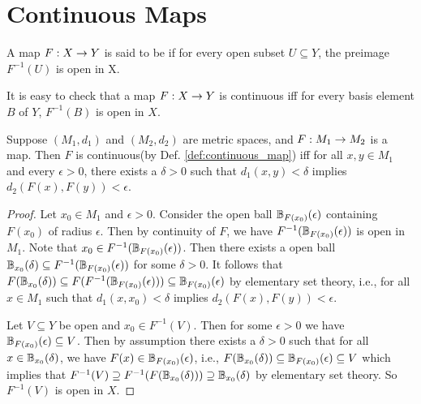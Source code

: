 \documentclass[11pt,a4paper]{article}
\begin{document}
\section{Continuous Maps}

\begin{mydef}\label{def:continuous_map}
    A map $F:X\rightarrow Y$ is said to be  if for every open subset $U\subseteq Y$, the preimage $F^{-1}(U)$ is open in X.
\end{mydef}

\begin{remark}
It is easy to check that a map $F:X\rightarrow Y$ is continuous iff for every basis element $B$ of $Y$, $F^{-1}(B)$ is open in $X$.
\end{remark}

\begin{prop}\label{prop:epsilon_delta_continuity}
Suppose $(M_1,d_1)$ and $(M_2,d_2)$ are metric spaces, and $F:M_1\rightarrow M_2$ is a map. Then $F$ is continuous(by Def. \ref{def:continuous_map}) iff for all $x,y\in M_1$ and every $\epsilon>0$, there exists a $\delta>0$ such that $d_1(x,y)<\delta$ implies $d_2(F(x),F(y))<\epsilon$.
\end{prop}

\begin{proof}
\forward Let $x_0\in M_1$ and $\epsilon>0$. Consider the open ball $\mathbb{B}_{F(x_0)}(\epsilon)$ containing $F(x_0)$ of radius $\epsilon$. Then by continuity of $F$, we have $F^{-1}(\mathbb{B}_{F(x_0)}(\epsilon))$ is open in $M_1$. Note that $x_0\in F^{-1}(\mathbb{B}_{F(x_0)}(\epsilon))$. Then there exists a open ball $\mathbb{B}_{x_0}(\delta)\subseteq F^{-1}(\mathbb{B}_{F(x_0)}(\epsilon))$ for some $\delta>0$. It follows that $F(\mathbb{B}_{x_0}(\delta))\subseteq F(F^{-1}(\mathbb{B}_{F(x_0)}(\epsilon)))\subseteq \mathbb{B}_{F(x_0)}(\epsilon)$ by elementary set theory, i.e., for all $x\in M_1$ such that $d_1(x,x_0)<\delta$ implies $d_2(F(x),F(y))<\epsilon$.  

\converse Let $V\subseteq Y$ be open and $x_0\in F^{-1}(V)$. Then for some $\epsilon>0$ we have $\mathbb{B}_{F(x_0)}(\epsilon)\subseteq V$. Then by assumption there exists a $\delta>0$ such that for all $x\in \mathbb{B}_{x_0}(\delta)$, we have $F(x)\in \mathbb{B}_{F(x_0)}(\epsilon)$, i.e., $F(\mathbb{B}_{x_0}(\delta))\subseteq \mathbb{B}_{F(x_0)}(\epsilon)\subseteq V$ which implies that $F^{-1}(V)\supseteq F^{-1}(F(\mathbb{B}_{x_0}(\delta)))\supseteq \mathbb{B}_{x_0}(\delta)$ by elementary set theory. So $F^{-1}(V)$ is open in $X$.
\end{proof}
\end{document}
